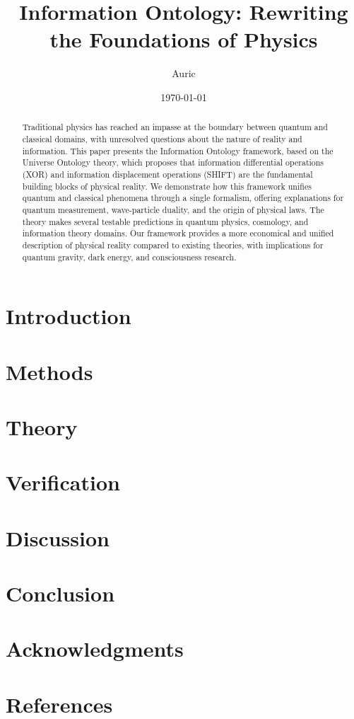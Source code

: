 \documentclass[12pt,letterpaper]{article}
\title{Information Ontology: Rewriting the Foundations of Physics}
\author[1]{Auric}
\affil[1]{Universe Ontology Research Group}
\date{\today}
\begin{document}
\maketitle

\begin{abstract}
Traditional physics has reached an impasse at the boundary between quantum and classical domains, with unresolved questions about the nature of reality and information. This paper presents the Information Ontology framework, based on the Universe Ontology theory, which proposes that information differential operations (XOR) and information displacement operations (SHIFT) are the fundamental building blocks of physical reality. We demonstrate how this framework unifies quantum and classical phenomena through a single formalism, offering explanations for quantum measurement, wave-particle duality, and the origin of physical laws. The theory makes several testable predictions in quantum physics, cosmology, and information theory domains. Our framework provides a more economical and unified description of physical reality compared to existing theories, with implications for quantum gravity, dark energy, and consciousness research.
\end{abstract}

\section{Introduction}


\section{Methods}


\section{Theory}


\section{Verification}




\section{Discussion}


\section{Conclusion}


\section*{Acknowledgments}


\section*{References}

\end{document}
